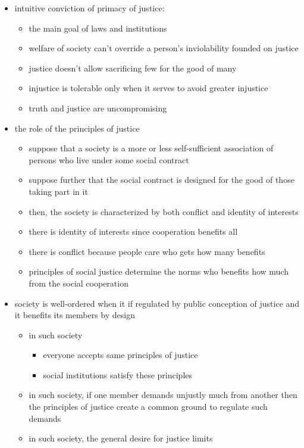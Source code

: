 \begin{itemize}
	\item intuitive conviction of primacy of justice:
	\begin{itemize}
		\item the main goal of laws and institutions
		\item welfare of society can't override a person's
		inviolability founded on justice
		\item justice doesn't allow sacrificing few for the good of
		many
		\item injustice is tolerable only when it serves to avoid
		greater injustice
		\item truth and justice are uncompromising
	\end{itemize}
	\item the role of the principles of justice
	\begin{itemize}
		\item suppose that a society is a more or less self-sufficient
		association of persons who live under some social contract
		\item suppose further that the social contract is designed for
		the good of those taking part in it
		\item then, the society is characterized by both conflict and
		identity of interests
		\item there is identity of interests since cooperation benefits
		all
		\item there is conflict because people care who gets how many
		benefits
		\item principles of social justice determine the norms who
		benefits how much from the social cooperation
	\end{itemize}
	\item society is well-ordered when it if regulated by public
	conception of justice and it benefits its members by design
	\begin{itemize}
		\item in such society
		\begin{itemize}
			\item everyone accepts same principles of justice
			\item social institutions satisfy these principles
		\end{itemize}
		\item in such society, if one member demands unjustly much from
		another then the principles of justice create a common ground
		to regulate such demands
		\item in such society, the general desire for justice limits

\end{itemize}
\end{itemize}
